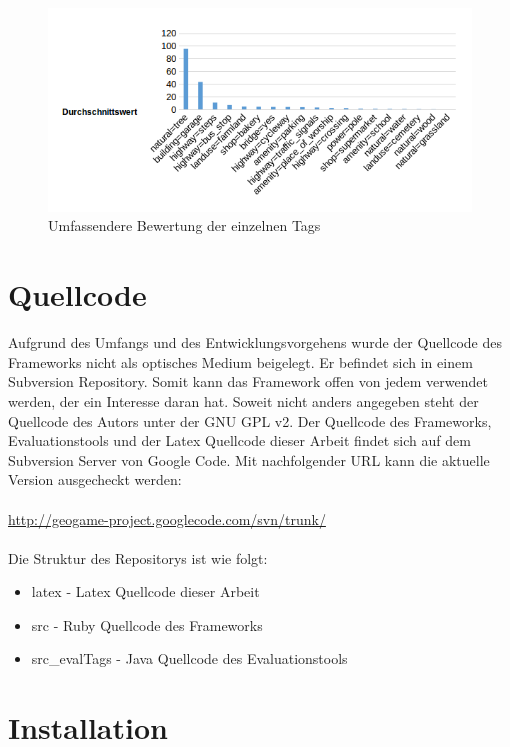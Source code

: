 \begin{figure}[H]
\begin{center}
\includegraphics[width=150mm]{images/ch8_valued3.png}
\caption{Umfassendere Bewertung der einzelnen Tags}
\label{img:ch8_valued3}
\end{center}
\end{figure}

\newpage

\section{Quellcode}

Aufgrund des Umfangs und des Entwicklungsvorgehens wurde der Quellcode des Frameworks nicht als optisches Medium beigelegt. Er befindet sich in einem Subversion Repository.
Somit kann das Framework offen von jedem verwendet werden, der ein Interesse daran hat. Soweit nicht anders angegeben steht der Quellcode des Autors unter der GNU GPL v2.
Der Quellcode des Frameworks, Evaluationstools und der Latex Quellcode dieser Arbeit findet sich auf dem Subversion Server von Google Code.
Mit nachfolgender URL kann die aktuelle Version ausgecheckt werden:\\\\
\url{http://geogame-project.googlecode.com/svn/trunk/}\\\\

Die Struktur des Repositorys ist wie folgt:
\begin{itemize}
\item latex - Latex Quellcode dieser Arbeit
\item src - Ruby Quellcode des Frameworks
\item src\_evalTags - Java Quellcode des Evaluationstools
\end{itemize}

\section{Installation}

